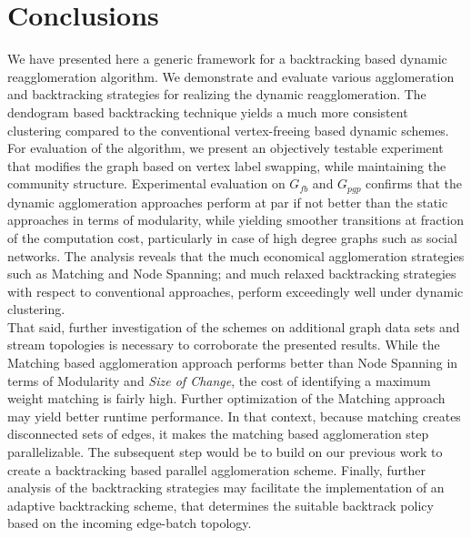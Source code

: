 \documentclass[conference]{IEEEtran}
\begin{document}
\section{Conclusions}
We have presented here a generic framework for a backtracking based dynamic 
reagglomeration algorithm. We demonstrate and evaluate various agglomeration 
and backtracking strategies for realizing the dynamic reagglomeration. The 
dendogram based backtracking technique yields a much more consistent clustering 
compared to the conventional vertex-freeing based dynamic schemes. For
evaluation of the algorithm, we present an objectively testable experiment 
that modifies the graph based on vertex label swapping, while maintaining the 
community structure. Experimental evaluation on $G_{fb}$ \cite{fb} and 
$G_{pgp}$ \cite{pgp} confirms that the dynamic agglomeration approaches perform 
at par if not better than the static approaches in terms of modularity, while 
yielding smoother transitions at fraction of the computation cost, 
particularly in case of high degree graphs such as social networks. The 
analysis reveals that the much economical agglomeration strategies such as 
Matching and Node Spanning; and much relaxed backtracking strategies with 
respect to conventional approaches, perform exceedingly well under dynamic 
clustering.\\
That said, further investigation of the schemes on additional graph data sets 
and stream topologies is necessary to corroborate the presented results. While 
the Matching based agglomeration approach performs better than Node Spanning in 
terms of Modularity and \emph{Size of Change}, the cost of identifying a 
maximum weight matching is fairly high. Further optimization of the Matching 
approach may yield better runtime performance. In that context, because 
matching creates disconnected sets of edges, it makes the matching based 
agglomeration step parallelizable. The subsequent step would be to build on our 
previous work to create a backtracking based parallel agglomeration scheme. 
Finally, further analysis of the backtracking strategies may facilitate the 
implementation of an adaptive backtracking scheme, that determines the suitable 
backtrack policy based on the incoming edge-batch topology.
\end{document}
